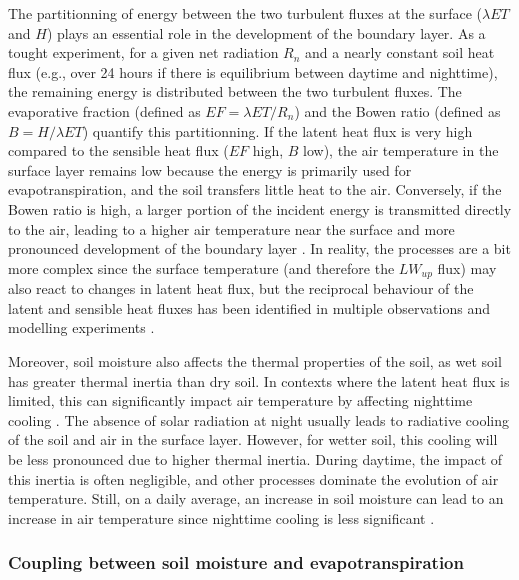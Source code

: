 The partitionning of energy between the two turbulent fluxes at the surface ($\lambda ET$ and $H$) plays an essential role in the development of the boundary layer. As a tought experiment, for a given net radiation $R_n$ and a nearly constant soil heat flux (e.g., over 24 hours if there is equilibrium between daytime and nighttime), the remaining energy is distributed between the two turbulent fluxes. The evaporative fraction (defined as $EF = \lambda ET / R_n$) %
and the Bowen ratio (defined as $B = H / \lambda ET$) quantify this partitionning. If the latent heat flux is very high compared to the sensible heat flux ($EF$ high, $B$ low), the air temperature in the surface layer remains low because the energy is primarily used for evapotranspiration, and the soil transfers little heat to the air. Conversely, if the Bowen ratio is high, a larger portion of the incident energy is transmitted directly to the air, leading to a higher air temperature near the surface and more pronounced development of the boundary layer \citep{betts_fife_1995}.
In reality, the processes are a bit more complex since the surface temperature (and therefore the $LW_{up}$ flux) may also react to changes in latent heat flux, but the reciprocal behaviour of the latent and sensible heat fluxes has been identified in multiple observations and modelling experiments \citep{betts_fife_1995, seneviratne_investigating_2010}. %

Moreover, soil moisture also affects the thermal properties of the soil, as wet soil has greater thermal inertia than dry soil. In contexts where the latent heat flux is limited, this can significantly impact air temperature by affecting nighttime cooling \citep{ait-mesbah_role_2015}. The absence of solar radiation at night usually leads to radiative cooling of the soil and air in the surface layer. However, for wetter soil, this cooling will be less pronounced due to higher thermal inertia. During daytime, the impact of this inertia is often negligible, and other processes dominate the evolution of air temperature. Still, on a daily average, an increase in soil moisture can lead to an increase in air temperature since nighttime cooling is less significant \citep{cheruy_role_2017}.

\subsubsection*{Coupling between soil moisture and evapotranspiration}

